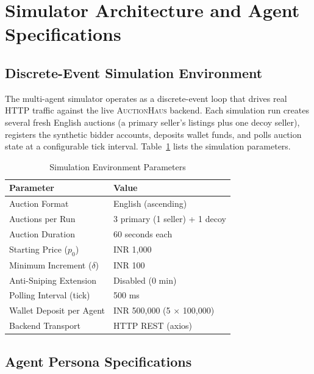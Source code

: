 \documentclass[11pt]{article}
\begin{document}
\section{Simulator Architecture and Agent Specifications}

\subsection{Discrete-Event Simulation Environment}

The multi-agent simulator operates as a discrete-event loop that drives
real HTTP traffic against the live \textsc{AuctionHaus} backend. Each
simulation run creates several fresh English auctions (a primary
seller's listings plus one decoy seller), registers the synthetic bidder
accounts, deposits wallet funds, and polls auction state at a
configurable tick interval. Table~\ref{tab:sim_params} lists the
simulation parameters.

\begin{table}[ht]
\centering
\caption{Simulation Environment Parameters}
\label{tab:sim_params}
\begin{tabular}{ll}
\toprule
\textbf{Parameter} & \textbf{Value} \\
\midrule
Auction Format & English (ascending) \\
Auctions per Run & 3 primary (1 seller) + 1 decoy \\
Auction Duration & 60 seconds each \\
Starting Price ($p_0$) & INR 1,000 \\
Minimum Increment ($\delta$) & INR 100 \\
Anti-Sniping Extension & Disabled (0 min) \\
Polling Interval (tick) & 500 ms \\
Wallet Deposit per Agent & INR 500,000 (5 $\times$ 100,000) \\
Backend Transport & HTTP REST (axios) \\
\bottomrule
\end{tabular}
\end{table}

\subsection{Agent Persona Specifications}
\label{sec:agents}
\end{document}
